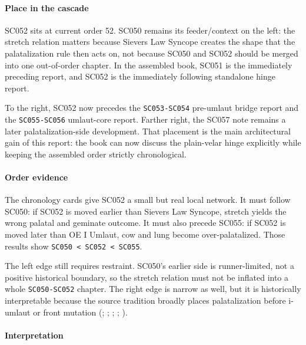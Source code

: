 \documentclass[
  british,
  a4paper,
]{article}
\begin{document}
\paragraph{Place in the cascade}\label{place-in-the-cascade-32}

SC052 sits at current order 52. SC050 remains its feeder/context on the
left: the stretch relation matters because Sievers Law Syncope creates
the shape that the palatalization rule then acts on, not because SC050
and SC052 should be merged into one out-of-order chapter. In the
assembled book, SC051 is the immediately preceding report, and SC052 is
the immediately following standalone hinge report.

To the right, SC052 now precedes the \texttt{SC053-SC054} pre-umlaut
bridge report and the \texttt{SC055-SC056} umlaut-core report. Farther
right, the SC057 note remains a later palatalization-side development.
That placement is the main architectural gain of this report: the book
can now discuss the plain-velar hinge explicitly while keeping the
assembled order strictly chronological.

\paragraph{Order evidence}\label{order-evidence-32}

The chronology cards give SC052 a small but real local network. It must
follow SC050: if SC052 is moved earlier than Sievers Law Syncope,
stretch yields the wrong palatal and geminate outcome. It must also
precede SC055: if SC052 is moved later than OE I Umlaut, cow and lung
become over-palatalized. Those results show
\texttt{SC050\ \textless{}\ SC052\ \textless{}\ SC055}.

The left edge still requires restraint. SC050's earlier side is
runner-limited, not a positive historical boundary, so the stretch
relation must not be inflated into a whole \texttt{SC050-SC052} chapter.
The right edge is narrow as well, but it is historically interpretable
because the source tradition broadly places palatalization before
i-umlaut or front mutation (; ;
; ; ).

\paragraph{Interpretation}\label{interpretation-32}
\end{document}
